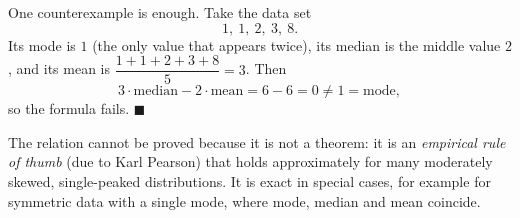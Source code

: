 One counterexample is enough. Take the data set
\[
1,\ 1,\ 2,\ 3,\ 8 .
\]
Its mode is $1$ (the only value that appears twice), its median is the middle value $2$, and its mean is $\dfrac{1+1+2+3+8}{5}=3$. Then
\[
3\cdot\text{median}-2\cdot\text{mean}=6-6=0\ne1=\text{mode},
\]
so the formula fails. $\blacksquare$

The relation cannot be proved because it is not a theorem: it is an \emph{empirical rule of thumb} (due to Karl Pearson) that holds approximately for many moderately skewed, single-peaked distributions. It is exact in special cases, for example for symmetric data with a single mode, where mode, median and mean coincide.
